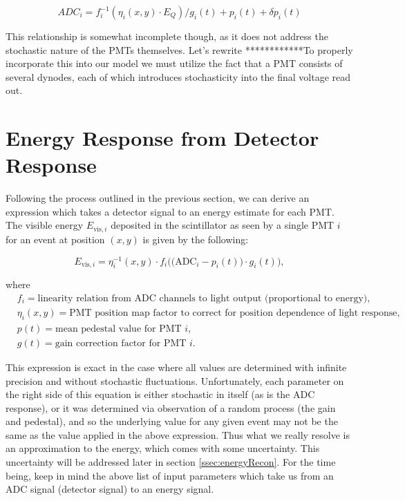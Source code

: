 \begin{equation} \label{eq:pmtResponse}
ADC_i = f_i^{-1}\left(\eta_i(x,y) \cdot E_{Q} \right)/g_i(t) + p_i(t) + \delta p_i(t) 
\end{equation}

This relationship is somewhat incomplete though, as it does not address the
stochastic nature of the PMTs themselves. Let's rewrite ************To properly incorporate this into our
model we must utilize the fact that a PMT consists of several dynodes, each of which
introduces stochasticity into the final voltage read out. 




\section{Energy Response from Detector Response} \label{sec:EnergyResponse}
Following the process outlined in the previous section, we can derive an
expression which takes a detector signal to an energy estimate for each PMT.
The visible energy $E_{\mathrm{vis},i}$ deposited
in the scintillator as seen by a single PMT $i$ for an event at position $(x,y)$ 
is given by the following: 

\begin{equation} \label{eq:EvisResponse}
E_{\mathrm{vis},i} = \eta_i^{-1}(x,y) \cdot f_i\bigg( \Big( \mathrm{ADC}_i - p_i(t) \Big) \cdot g_i(t) \bigg)  ,
\end{equation}

\noindent where 
\begin{align*}
  &f_i = \text{linearity relation from ADC channels to light output (proportional to energy),}\\
  &\eta_i(x,y) = \text{PMT position map factor to correct for position dependence of light response,} \\
  &p(t) = \text{mean pedestal value for PMT } i,\\
  &g(t) = \text{gain correction factor for PMT }i.
\end{align*}

This expression is exact in the case where all values are determined with infinite
precision and without stochastic fluctuations. Unfortunately, each parameter on the right
side of this equation is either stochastic in itself (as is the ADC response), or it was
determined via observation of a random process (the gain and pedestal), and so
the underlying value for any given event may not be the same as the value applied in the
above expression. Thus what we
really resolve is an approximation to the energy, which comes with some uncertainty. This
uncertainty will be addressed later in section \ref{ssec:energyRecon}.
For the time being, keep in mind the above list of
input parameters which take us from an ADC signal (detector signal) to an energy signal. 

